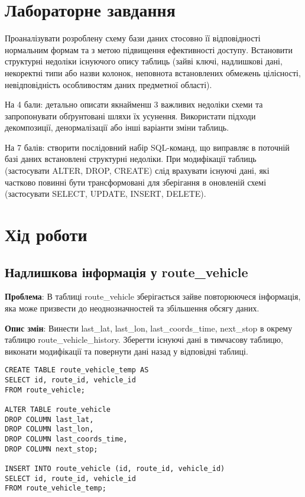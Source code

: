 \documentclass[14pt]{extreport}
\begin{document}
\begin{normalsize}
	\section*{Лабораторне завдання}


Проаналізувати розроблену схему бази даних стосовно її відповідності нормальним формам та з метою підвищення ефективності доступу. Встановити структурні недоліки існуючого опису таблиць (зайві ключі, надлишкові дані, некоректні типи або назви колонок, неповнота встановлених обмежень цілісності, невідповідність особливостям даних предметної області).

На 4 бали: детально описати якнайменш 3 важливих недоліки схеми та запропонувати обґрунтовані шляхи їх усунення. Використати підходи декомпозиції, денормалізації або інші варіанти зміни таблиць.

На 7 балів: створити послідовний набір SQL-команд, що виправляє в поточній базі даних встановлені структурні недоліки. При модифікації таблиць (застосувати ALTER, DROP, CREATE) слід врахувати існуючі дані, які частково повинні бути трансформовані для зберігання в оновленій схемі (застосувати SELECT, UPDATE, INSERT, DELETE).
	
	\section*{Хід роботи}
	
	\subsection*{Надлишкова інформація у route\_vehicle}
	\textbf{Проблема}: В таблиці route\_vehicle зберігається зайве повторюючеся інформація, яка може призвести до неоднозначностей та збільшення обсягу даних.
	
	\textbf{Опис змін}: Винести last\_lat, last\_lon, last\_coords\_time, next\_stop в окрему таблицю route\_vehicle\_history. Зберегти існуючі дані в тимчасову таблицю, виконати модифікації та повернути дані назад у відповідні таблиці.
	\begin{lstlisting}
CREATE TABLE route_vehicle_temp AS
SELECT id, route_id, vehicle_id
FROM route_vehicle;

ALTER TABLE route_vehicle
DROP COLUMN last_lat,
DROP COLUMN last_lon,
DROP COLUMN last_coords_time,
DROP COLUMN next_stop;

INSERT INTO route_vehicle (id, route_id, vehicle_id)
SELECT id, route_id, vehicle_id
FROM route_vehicle_temp;


\end{lstlisting}
\end{normalsize}
\end{document}
